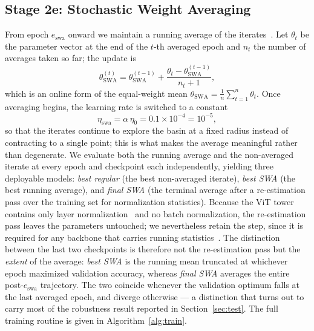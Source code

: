 \documentclass[10pt,journal]{IEEEtran}
\begin{document}
\subsection{Stage 2e: Stochastic Weight Averaging}\label{sec:swa}
From epoch $e_{\mathrm{swa}}$ onward we maintain a running average of the
iterates~\cite{izmailov2018swa}. Let $\theta_t$ be the parameter vector at the
end of the $t$-th averaged epoch and $n_t$ the number of averages taken so
far; the update is
\begin{equation}
\theta_{\mathrm{SWA}}^{(t)}=\theta_{\mathrm{SWA}}^{(t-1)}
  +\frac{\theta_t-\theta_{\mathrm{SWA}}^{(t-1)}}{n_t+1},
\label{eq:swa}
\end{equation}
which is an online form of the equal-weight mean
$\theta_{\mathrm{SWA}}=\frac{1}{n}\sum_{t=1}^{n}\theta_t$. Once averaging
begins, the learning rate is switched to a constant
\begin{equation}
\eta_{\mathrm{swa}}=\alpha\,\eta_0=0.1\times10^{-4}=10^{-5},
\end{equation}
so that the iterates continue to explore the basin at a fixed radius instead
of contracting to a single point; this is what makes the average meaningful
rather than degenerate. We evaluate both the running average and the
non-averaged iterate at every epoch and checkpoint each independently,
yielding three deployable models: \emph{best regular} (the best non-averaged
iterate), \emph{best SWA} (the best running average), and \emph{final SWA}
(the terminal average after a re-estimation pass over the training set for
normalization statistics). Because the ViT tower contains only layer
normalization~\cite{ba2016layernorm} and no batch normalization, the
re-estimation pass leaves the parameters untouched; we nevertheless retain the
step, since it is required for any backbone that carries running
statistics~\cite{ioffe2015batchnorm}. The distinction between the last two
checkpoints is therefore not the re-estimation pass but the \emph{extent} of
the average: \emph{best SWA} is the running mean truncated at whichever epoch
maximized validation accuracy, whereas \emph{final SWA} averages the entire
post-$e_{\mathrm{swa}}$ trajectory. The two coincide whenever the validation
optimum falls at the last averaged epoch, and diverge otherwise --- a
distinction that turns out to carry most of the robustness result reported in
Section~\ref{sec:test}. The full training routine is given in
Algorithm~\ref{alg:train}.
\end{document}
